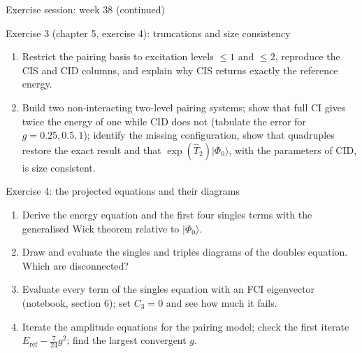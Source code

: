 \documentclass[aspectratio=169,10pt]{beamer}
\newcommand{\ket}[1]{\vert #1\rangle}
\begin{document}
\begin{frame}{Exercise session: week 38 (continued)}
  \footnotesize
  \begin{block}{Exercise 3 (chapter 5, exercise 4): truncations and size consistency}
    \begin{enumerate}
      \item[a)] Restrict the pairing basis to excitation levels $\le1$ and $\le2$, reproduce the CIS and CID columns, and explain why CIS returns exactly the reference energy.
      \item[b)] Build two non-interacting two-level pairing systems; show that full CI gives twice the energy of one while CID does not (tabulate the error for $g=0.25,0.5,1$); identify the missing configuration, show that quadruples restore the exact result and that $\exp(\hat{T}_2)\ket{\Phi_0}$, with the parameters of CID, is size consistent.
    \end{enumerate}
  \end{block}
  \begin{block}{Exercise 4: the projected equations and their diagrams}
    \begin{enumerate}
      \item[a)] Derive the energy equation and the first four singles terms with the generalised Wick theorem relative to $\ket{\Phi_0}$.
      \item[b)] Draw and evaluate the singles and triples diagrams of the doubles equation. Which are disconnected?
      \item[c)] Evaluate every term of the singles equation with an FCI eigenvector (notebook, section 6); set $C_3=0$ and see how much it fails.
      \item[d)] Iterate the amplitude equations for the pairing model; check the first iterate $E_{\mathrm{ref}}-\frac{7}{24}g^2$; find the largest convergent $g$.
    \end{enumerate}
  \end{block}
\end{frame}
\end{document}
